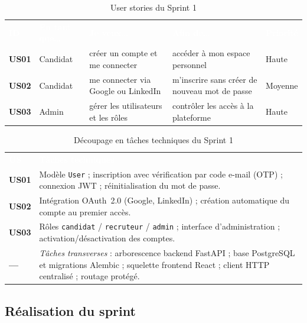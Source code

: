 \documentclass[12pt,a4paper]{report}
\begin{document}
\begin{table}[H]
\centering
\caption{User stories du Sprint 1}
\label{tab:backlog-s1}
\small
\begin{tabularx}{\textwidth}{>{\bfseries}p{0.9cm} p{1.9cm} X X p{1.4cm}}
\rowcolor{tabheader}
\textcolor{white}{\textbf{ID}} & \textcolor{white}{\textbf{En tant que\ldots}} & \textcolor{white}{\textbf{Je veux\ldots}} & \textcolor{white}{\textbf{Afin de\ldots}} & \textcolor{white}{\textbf{Priorité}} \\
US01 & Candidat & créer un compte et me connecter & accéder à mon espace personnel & Haute \\
\rowcolor{tabalt}
US02 & Candidat & me connecter via Google ou LinkedIn & m'inscrire sans créer de nouveau mot de passe & Moyenne \\
US03 & Admin & gérer les utilisateurs et les rôles & contrôler les accès à la plateforme & Haute \\
\bottomrule
\end{tabularx}
\end{table}

\begin{table}[H]
\centering
\caption{Découpage en tâches techniques du Sprint 1}
\label{tab:taches-s1}
\small
\begin{tabularx}{\textwidth}{>{\bfseries}p{1.2cm} X}
\rowcolor{tabheader}
\textcolor{white}{\textbf{US}} & \textcolor{white}{\textbf{Tâches techniques}} \\
US01 & Modèle \texttt{User} ; inscription avec vérification par code e-mail (OTP) ; connexion JWT ; réinitialisation du mot de passe. \\
\rowcolor{tabalt}
US02 & Intégration OAuth~2.0 (Google, LinkedIn) ; création automatique du compte au premier accès. \\
US03 & Rôles \texttt{candidat} / \texttt{recruteur} / \texttt{admin} ; interface d'administration ; activation/désactivation des comptes. \\
\rowcolor{tabalt}
--- & \textit{Tâches transverses} : arborescence backend FastAPI ; base PostgreSQL et migrations Alembic ; squelette frontend React ; client HTTP centralisé ; routage protégé. \\
\bottomrule
\end{tabularx}
\end{table}

\subsection{Réalisation du sprint}
\end{document}
